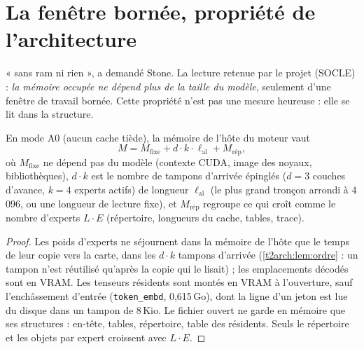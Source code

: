\section{La fenêtre bornée, propriété de l'architecture}\label{t2arch:sec:fenetre}

« sans ram ni rien », a demandé Stone. La lecture retenue par le projet (SOCLE) : \emph{la mémoire occupée ne dépend plus de la taille du modèle}, seulement d'une fenêtre de travail bornée. Cette propriété n'est pas une mesure heureuse : elle se lit dans la structure.

\begin{proposition}\label{t2arch:prop:fenetre}
En mode A0 (aucun cache tiède), la mémoire de l'hôte du moteur vaut
\[
M = M_{\mathrm{fixe}} + d \cdot k \cdot \ell_{\mathrm{al}} + M_{\mathrm{rép}},
\]
où $M_{\mathrm{fixe}}$ ne dépend pas du modèle (contexte CUDA, image des noyaux, bibliothèques), $d \cdot k$ est le nombre de tampons d'arrivée épinglés ($d = 3$ couches d'avance, $k = 4$ experts actifs) de longueur $\ell_{\mathrm{al}}$ (le plus grand tronçon arrondi à 4\,096, ou une longueur de lecture fixe), et $M_{\mathrm{rép}}$ regroupe ce qui croît comme le nombre d'experts $L \cdot E$ (répertoire, longueurs du cache, tables, trace).
\end{proposition}

\begin{proof}
Les poids d'experts ne séjournent dans la mémoire de l'hôte que le temps de leur copie vers la carte, dans les $d \cdot k$ tampons d'arrivée (\cref{t2arch:lem:ordre} : un tampon n'est réutilisé qu'après la copie qui le lisait) ; les emplacements décodés sont en VRAM. Les tenseurs résidents sont montés en VRAM à l'ouverture, sauf l'enchâssement d'entrée (\texttt{token\_embd}, 0,615\,Go), dont la ligne d'un jeton est lue du disque dans un tampon de 8\,Kio. Le fichier ouvert ne garde en mémoire que ses structures : en-tête, tables, répertoire, table des résidents. Seuls le répertoire et les objets par expert croissent avec $L \cdot E$.
\end{proof}

